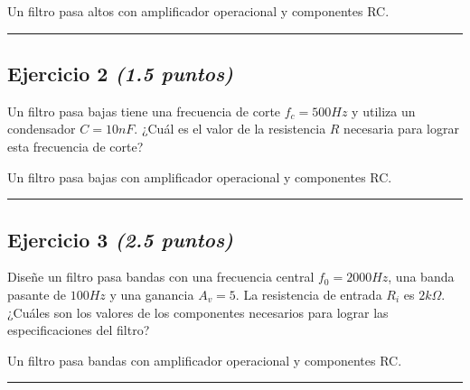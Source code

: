 \documentclass[11pt,a4paper]{article}
\begin{document}
  \begin{tcolorbox}[colback=gray!5, colframe=gray!40, fonttitle=\bfseries, title={Diagrama sugerido}]
    Un filtro pasa altos con amplificador operacional y componentes RC.
  \end{tcolorbox}

\vspace{2mm}
\rule{\linewidth}{0.2pt}
\vspace{3cm}  %



\subsection*{Ejercicio 2 \normalfont\normalsize\textit{(1.5 puntos)}}
Un filtro pasa bajas tiene una frecuencia de corte $f_c = 500 Hz$ y utiliza un condensador $C = 10 nF$. ¿Cuál es el valor de la resistencia $R$ necesaria para lograr esta frecuencia de corte?

  \begin{tcolorbox}[colback=gray!5, colframe=gray!40, fonttitle=\bfseries, title={Diagrama sugerido}]
    Un filtro pasa bajas con amplificador operacional y componentes RC.
  \end{tcolorbox}

\vspace{2mm}
\rule{\linewidth}{0.2pt}
\vspace{3cm}  %



\subsection*{Ejercicio 3 \normalfont\normalsize\textit{(2.5 puntos)}}
Diseñe un filtro pasa bandas con una frecuencia central $f_0 = 2000 Hz$, una banda pasante de $100 Hz$ y una ganancia $A_v = 5$. La resistencia de entrada $R_i$ es $2 k\Omega$. ¿Cuáles son los valores de los componentes necesarios para lograr las especificaciones del filtro?

  \begin{tcolorbox}[colback=gray!5, colframe=gray!40, fonttitle=\bfseries, title={Diagrama sugerido}]
    Un filtro pasa bandas con amplificador operacional y componentes RC.
  \end{tcolorbox}

\vspace{2mm}
\rule{\linewidth}{0.2pt}
\vspace{3cm}  %
\end{document}
